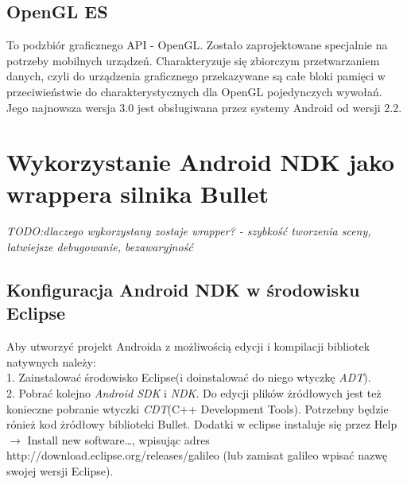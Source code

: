\subsection{OpenGL ES}
To podzbiór graficznego API - OpenGL. Zostało zaprojektowane specjalnie na
potrzeby mobilnych urządzeń. Charakteryzuje się zbiorczym przetwarzaniem
danych, czyli do urządzenia graficznego przekazywane są całe bloki pamięci w
przeciwieństwie do charakterystycznych dla OpenGL pojedynczych wywołań. Jego
najnowsza wersja 3.0 jest obsługiwana przez systemy Android od wersji 2.2.
 
  \newpage
  \section{Wykorzystanie Android NDK jako wrappera silnika Bullet}
  \emph{TODO:dlaczego wykorzystany zostaje wrapper? - szybkość tworzenia sceny,
  łatwiejsze debugowanie, bezawaryjność}
  \subsection{Konfiguracja Android NDK w środowisku Eclipse}
  Aby utworzyć projekt Androida z możliwością edycji i kompilacji bibliotek
  natywnych należy: \\
  1. Zainstalować środowisko Eclipse(i doinstalować do niego wtyczkę
  \emph{ADT}).\\
  2. Pobrać kolejno \emph{Android SDK} i \emph{NDK}. Do edycji plików żródłowych
  jest też konieczne pobranie wtyczki \emph{CDT}(C++ Development Tools). Potrzebny
  będzie rónież kod żródłowy biblioteki Bullet. Dodatki w eclipse instaluje się
  przez Help $ \rightarrow $ Install new software\ldots , wpisując adres
  http://download.eclipse.org/releases/galileo (lub zamisat galileo wpisać nazwę swojej wersji Eclipse).
  
